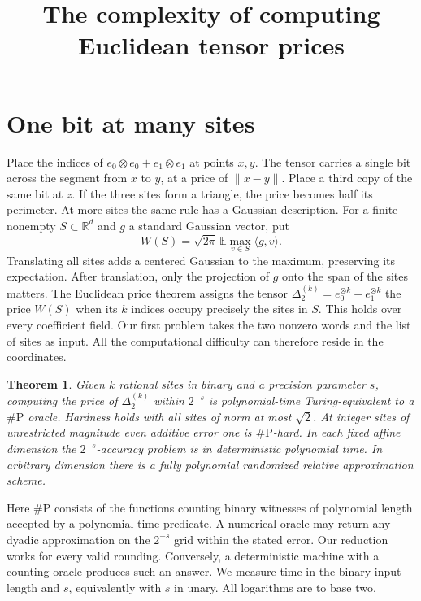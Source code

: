 \documentclass[11pt,letterpaper]{article}
\title{The complexity of computing Euclidean tensor prices}
\author{}
\newtheorem{theorem}{Theorem}[section]
\theoremstyle{definition}
\newcommand{\E}{\mathbb E}
\newcommand{\R}{\mathbb R}
\newcommand{\sharpP}{\#\mathrm P}
\newcommand{\norm}[1]{\lVert#1\rVert}
\newcommand{\ip}[2]{\langle #1,#2\rangle}
\begin{document}
\maketitle

\section{One bit at many sites}
\label{sec:intro}

Place the indices of \(e_0\otimes e_0+e_1\otimes e_1\) at points \(x,y\).
The tensor carries a single bit across the segment from \(x\) to \(y\), at a
price of \(\norm{x-y}\). Place a third copy of the same bit at \(z\).
If the three sites form a triangle, the price becomes half its perimeter.
At more sites the same rule has a Gaussian description. For a finite
nonempty \(S\subset\R^d\) and \(g\) a standard Gaussian vector, put
\begin{equation}
 W(S)=\sqrt{2\pi}\,\E\max_{v\in S}\ip{g}{v}.
 \label{eq:width}
\end{equation}
Translating all sites adds a centered Gaussian to the maximum, preserving
its expectation. After translation, only the projection of \(g\) onto the
span of the sites matters.
The Euclidean price theorem assigns the tensor
\(\Delta^{(k)}_2=e_0^{\otimes k}+e_1^{\otimes k}\) the price \(W(S)\)
when its \(k\) indices occupy precisely the sites in \(S\). This holds over
every coefficient field. Our first problem takes the two nonzero words
and the list of sites as input. All the computational difficulty can
therefore reside in the coordinates. \cite[Theorem~1.1]{euclid}

\begin{theorem}\label{thm:main}
Given \(k\) rational sites in binary and a precision parameter \(s\), computing
the price of \(\Delta^{(k)}_2\) within \(2^{-s}\) is polynomial-time
Turing-equivalent to a \(\sharpP\) oracle. Hardness holds with all sites of
norm at most \(\sqrt 2\). At integer sites of unrestricted magnitude even
additive error one is \(\sharpP\)-hard. In each fixed affine dimension
the \(2^{-s}\)-accuracy problem is in deterministic polynomial time.
In arbitrary dimension there is a fully polynomial randomized relative
approximation scheme.
\end{theorem}

Here \(\sharpP\) consists of the functions counting binary witnesses of
polynomial length accepted by a polynomial-time predicate. A numerical
oracle may return any dyadic approximation on the \(2^{-s}\) grid within
the stated error. Our reduction works for every valid rounding. Conversely,
a deterministic machine with a counting oracle produces such an answer.
We measure time in the binary input length and \(s\), equivalently with
\(s\) in unary. All logarithms are to base two.
\end{document}
